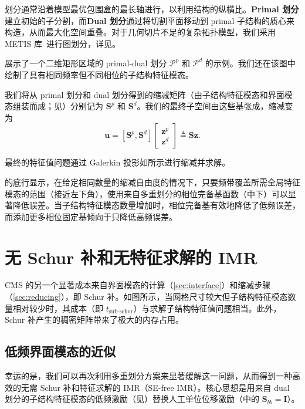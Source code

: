 划分通常沿着模型最优包围盒的最长轴进行，以利用结构的纵横比。\textbf{Primal 划分}建立初始的子分割，而\textbf{Dual 划分}通过将切割平面移动到 primal 子结构的质心来构造，从而最大化空间重叠。对于几何切片不足的复杂拓扑模型，我们采用 METIS 库~\cite{Karypis1997METIS}进行图划分，详见。

展示了一个二维矩形区域的 primal-dual 划分 $\mathcal{P}^p$ 和 $\mathcal{P}^d$ 的示例。我们还在该图中绘制了具有相同频率但不同相位的子结构特征模态。

我们将从 primal 划分和 dual 划分得到的缩减矩阵（由子结构特征模态和界面模态组装而成；见）分别记为 $\mathbf{S}^p$ 和 $\mathbf{S}^d$。我们的最终子空间由这些基张成，缩减变为
\begin{equation}
  \mathbf{u}= [\mathbf{S}^p, \mathbf{S}^d]
  \begin{bmatrix}
    \mathbf{z}^{p} \\
    \mathbf{z}^{d}
  \end{bmatrix}
  \triangleq \mathbf{S} \mathbf{z}.
    \label{eq:pd-subspace}
\end{equation}

最终的特征值问题通过 Galerkin 投影如所示进行缩减并求解。

的底行显示，在给定相同数量的缩减自由度的情况下，只要频带覆盖所需全局特征模态的范围（接近左下角），使用来自多重划分的相位完备基函数（中下）可以显著降低误差。当子结构特征模态数量增加时，相位完备基有效地降低了低频误差，而添加更多相位固定基倾向于只降低高频误差。

\section{无 Schur 补和无特征求解的 IMR}\label{sec:interface-modes}

CMS 的另一个显著成本来自界面模态的计算（\cref{sec:interface}）和缩减步骤（\cref{sec:reducing}），即 Schur 补。如图所示，当网格尺寸较大但子结构特征模态数量相对较少时，其成本（即 $t_{\text{sub-schur}}$）与求解子结构特征值问题相当。此外，Schur 补产生的稠密矩阵带来了极大的内存占用。

\subsection{低频界面模态的近似}\label{subsec:approx-interface-modes}

幸运的是，我们可以再次利用多重划分方案来显著缓解这一问题，从而得到一种高效的无需 Schur 补和特征求解的 IMR（SE-free IMR）。核心思想是用来自 dual 划分的子结构特征模态的低频激励（见）替换人工单位位移激励（中的 $\mathbf{S}_{bb} = \mathbf{I}$）。

